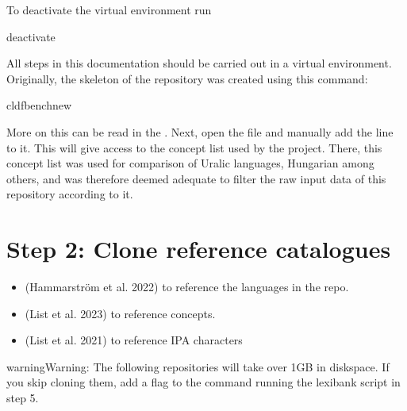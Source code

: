 \documentclass[letterpaper,10pt,english]{sphinxmanual}
\begin{document}
\sphinxAtStartPar
To deactivate the virtual environment run

\begin{sphinxVerbatim}[commandchars=\\\{\}]
deactivate
\end{sphinxVerbatim}

\sphinxAtStartPar
All steps in this documentation should be carried out in a virtual
environment. Originally, the skeleton of the repository was created using this
command:

\begin{sphinxVerbatim}[commandchars=\\\{\}]
cldfbenchnew
\end{sphinxVerbatim}

\sphinxAtStartPar
More on this can be read in the
.
Next, open the file  and manually add the line
 to it. This will give access to the
concept list used by the 
project. There, this concept list was used for comparison of Uralic languages,
Hungarian among others, and was therefore deemed adequate
to filter the raw input data of this repository according to it.


\section{Step 2: Clone reference catalogues}
\label{\detokenize{mkcldf:step-2-clone-reference-catalogues}}\begin{itemize}
\item {} 
\sphinxAtStartPar
{} (Hammarström et al. 2022)
to reference the languages in the repo.

\item {} 
\sphinxAtStartPar
{} (List et al. 2023) to
reference concepts.

\item {} 
\sphinxAtStartPar
{} (List et al. 2021) to reference IPA
characters

\end{itemize}

\begin{sphinxadmonition}{warning}{Warning:}
\sphinxAtStartPar
The following repositories will take over 1GB in disk\sphinxhyphen{}space. If you skip
cloning them,
add a  flag to the command running the lexibank script in step 5.
\end{sphinxadmonition}
\end{document}
